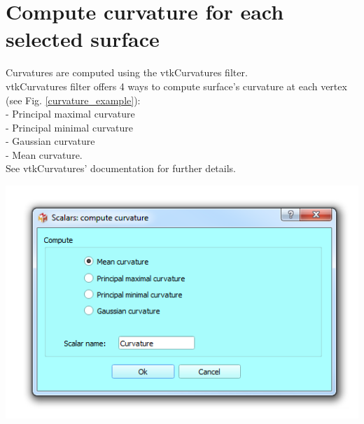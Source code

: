 \section{Compute curvature for each selected surface}
\noindent
\begin{minipage}{0.5\textwidth}
Curvatures are computed using the vtkCurvatures filter.\\
vtkCurvatures filter offers 4 ways to compute surface's
curvature at each vertex (see Fig. \ref{curvature_example}):\\
- Principal maximal curvature\\
- Principal minimal curvature\\
- Gaussian curvature\\
- Mean curvature.\\
See vtkCurvatures' documentation for further details.

\end{minipage}    
\begin{minipage}{0.5\textwidth}\centering
  \includegraphics[scale=0.5]{images/11/curvature_dialog.png}
\label{curvature_dialog}
 \end{minipage} 
\noindent


